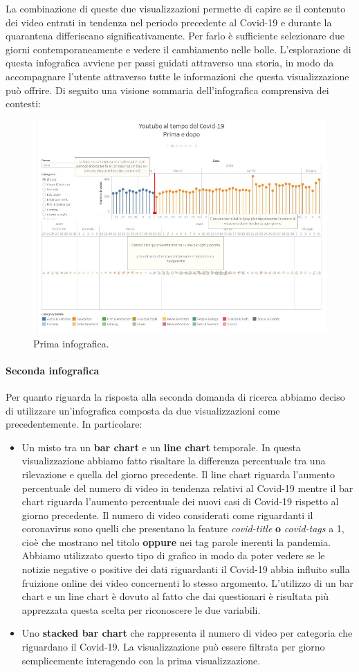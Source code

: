 \documentclass[10pt, a4paper,openany]{article}
\begin{document}
La combinazione di queste due visualizzazioni permette di capire se il contenuto dei video entrati in tendenza nel periodo precedente al Covid-19 e durante la quarantena differiscano significativamente. Per farlo è sufficiente selezionare due giorni contemporaneamente e vedere il cambiamento nelle bolle. L'esplorazione di questa infografica avviene per passi guidati attraverso una storia, in modo da accompagnare l'utente attraverso tutte le informazioni che questa visualizzazione può offrire. Di seguito una visione sommaria dell'infografica comprensiva dei contesti:
\begin{figure}[H]
	\centering
	\includegraphics[height=0.5 \linewidth]{pics/prima_infografica.png}
	\caption{Prima infografica.}
\end{figure}

\paragraph{Seconda infografica} Per quanto riguarda la risposta alla seconda domanda di ricerca abbiamo deciso di utilizzare un'infografica composta da due visualizzazioni come precedentemente. In particolare:
\begin{itemize}
	\item Un misto tra un \textbf{bar chart} e un \textbf{line chart} temporale. In questa visualizzazione abbiamo fatto risaltare la differenza percentuale tra una rilevazione e quella del giorno precedente. Il line chart riguarda l'aumento percentuale del numero di video in tendenza relativi al Covid-19 mentre il bar chart riguarda l'aumento percentuale dei nuovi casi di Covid-19 rispetto al giorno precedente. 
	Il numero di video considerati come riguardanti il coronavirus sono quelli che presentano la feature \textit{covid-title} \textbf{o} \textit{covid-tags} a 1, cioè che mostrano nel titolo \textbf{oppure} nei tag parole inerenti la pandemia.
	Abbiamo utilizzato questo tipo di grafico in modo da poter vedere se le notizie negative o positive dei dati riguardanti il Covid-19 abbia influito sulla fruizione online dei video concernenti lo stesso argomento.
	L'utilizzo di un bar chart e un line chart è dovuto al fatto che dai questionari è risultata più apprezzata questa scelta per riconoscere le due variabili.

	\item Uno \textbf{stacked bar chart} che rappresenta il numero di video per categoria che riguardano il Covid-19. La visualizzazione può essere filtrata per giorno semplicemente interagendo con la prima visualizzazione.
\end{itemize}
\end{document}

